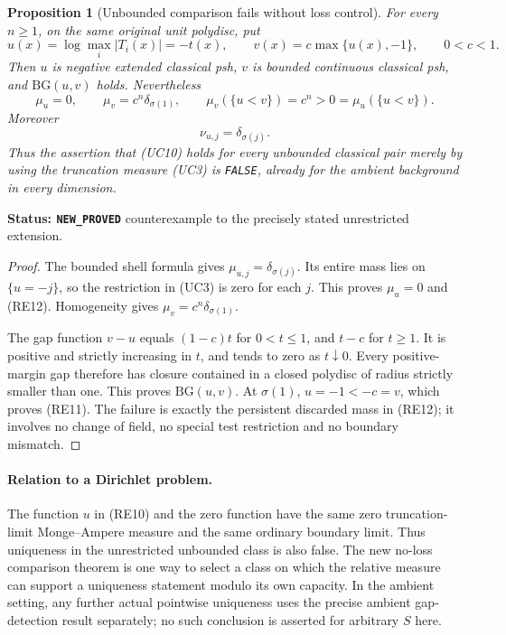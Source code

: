 \documentclass[11pt,a4paper]{article}
\numberwithin{equation}{section}
\newtheorem{proposition}[theorem]{Proposition}
\theoremstyle{definition}
\theoremstyle{remark}
\begin{document}
\begin{proposition}[Unbounded comparison fails without loss control]
\label{prop:r11-logarithmic-comparison-failure}
For every $n\geq1$, on the same original unit polydisc, put
\[
 u(x)=\log\max_i|T_i(x)|=-t(x),\qquad
 v(x)=c\max\{u(x),-1\},\qquad 0<c<1.
 \tag{RE10}
\]
Then $u$ is negative extended classical psh, $v$ is bounded
continuous classical psh, and $\mathrm{BG}(u,v)$ holds.
Nevertheless
\[
 \mu_u=0,\qquad
 \mu_v=c^n\delta_{\sigma(1)},\qquad
 \mu_v(\{u<v\})=c^n>0=\mu_u(\{u<v\}).
 \tag{RE11}
\]
Moreover
\[
          \nu_{u,j}=\delta_{\sigma(j)}.
 \tag{RE12}
\]
Thus the assertion that (UC10) holds for every unbounded
classical pair merely by using the truncation measure (UC3) is
\texttt{FALSE}, already for the ambient background in every
dimension.
\end{proposition}

\noindent\textbf{Status: \texttt{NEW\_PROVED}} counterexample
to the precisely stated unrestricted extension.

\begin{proof}
The bounded shell formula gives
$\mu_{u,j}=\delta_{\sigma(j)}$. Its entire mass lies on
$\{u=-j\}$, so the restriction in (UC3) is zero for each
$j$. This proves $\mu_u=0$ and (RE12). Homogeneity gives
$\mu_v=c^n\delta_{\sigma(1)}$.

The gap function $v-u$ equals $(1-c)t$ for $0<t\leq1$,
and $t-c$ for $t\geq1$. It is positive and strictly
increasing in $t$, and tends to zero as $t\downarrow0$.
Every positive-margin gap therefore has closure contained in a
closed polydisc of radius strictly smaller than one. This proves
$\mathrm{BG}(u,v)$. At $\sigma(1)$, $u=-1<-c=v$,
which proves (RE11). The failure is exactly the persistent
discarded mass in (RE12); it involves no change of field, no
special test restriction and no boundary mismatch.
\end{proof}

\paragraph{Relation to a Dirichlet problem.}
The function $u$ in (RE10) and the zero function have the same
zero truncation-limit Monge--Ampere measure and the same ordinary
boundary limit. Thus uniqueness in the unrestricted unbounded
class is also false. The new no-loss comparison theorem is one
way to select a class on which the relative measure can support
a uniqueness statement modulo its own capacity. In the ambient
setting, any further actual pointwise uniqueness uses the precise
ambient gap-detection result separately; no such conclusion is
asserted for arbitrary $S$ here.
\end{document}

